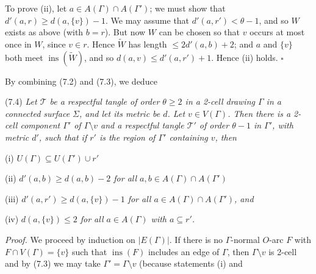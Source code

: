 To prove (ii), let $a \in A(\Gamma) \cap A(\Gamma')$; we must show that $d'(a, r) \ge d(a, \{v\}) - 1$. We may assume that $d'(a, r') < \theta - 1$, and so $W$ exists as above (with $b = r$). But now $W$ can be chosen so that $v$ occurs at most once in $W$, since $v \in r$. Hence $\widetilde{W}$ has length $\le 2d'(a, b) + 2$; and $a$ and $\{v\}$ both meet $\operatorname{ins}(\widetilde{W})$, and so $d(a, v) \le d'(a, r') + 1$. Hence (ii) holds. $\square$

By combining (7.2) and (7.3), we deduce

\stmt
(7.4) \textit{Let $\mathscr{T}$ be a respectful tangle of order $\theta \ge 2$ in a 2-cell drawing $\Gamma$ in a connected surface $\Sigma$, and let its metric be $d$. Let $v \in V(\Gamma)$. Then there is a 2-cell component $\Gamma'$ of $\Gamma \setminus v$ and a respectful tangle $\mathscr{T}'$ of order $\theta - 1$ in $\Gamma'$, with metric $d'$, such that if $r'$ is the region of $\Gamma'$ containing $v$, then}

\hspace*{12pt}(i) \textit{$U(\Gamma) \subseteq U(\Gamma') \cup r'$}

\hspace*{12pt}(ii) \textit{$d'(a, b) \ge d(a, b) - 2$ for all $a, b \in A(\Gamma) \cap A(\Gamma')$}

\hspace*{12pt}(iii) \textit{$d'(a, r') \ge d(a, \{v\}) - 1$ for all $a \in A(\Gamma) \cap A(\Gamma')$, and}

\hspace*{12pt}(iv) \textit{$d(a, \{v\}) \le 2$ for all $a \in A(\Gamma)$ with $a \subseteq r'$.}

\textit{Proof.} We proceed by induction on $|E(\Gamma)|$. If there is no $\Gamma$-normal $O$-arc $F$ with $F \cap V(\Gamma) = \{v\}$ such that $\operatorname{ins}(F)$ includes an edge of $\Gamma$, then $\Gamma \setminus v$ is 2-cell and by (7.3) we may take $\Gamma' = \Gamma \setminus v$ (because statements (i) and
